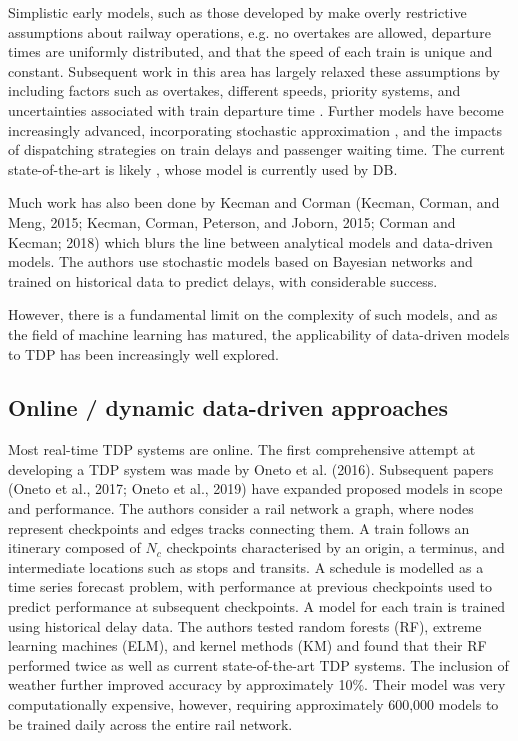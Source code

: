 \documentclass[12pt,a4paper]{article}
\begin{document}
Simplistic early models, such as those developed by \cite{frank_1966} make overly restrictive assumptions about railway operations, e.g. no overtakes are allowed, departure times are uniformly distributed, and that the speed of each train is unique and constant. Subsequent work in this area has largely relaxed these assumptions by including factors such as overtakes, different speeds, priority systems, and uncertainties associated with train departure time \cite{petersen_1974,chen_harker_1990}. Further models have become increasingly advanced, incorporating stochastic approximation \cite{carey_kwiecinski_1994}, and the impacts of dispatching strategies on train delays and passenger waiting time. The current state-of-the-art is likely \cite{berger_et_al_2011}, whose model is currently used by DB.

Much work has also been done by Kecman and Corman (Kecman, Corman, and Meng, 2015; Kecman, Corman, Peterson, and Joborn, 2015; Corman and Kecman; 2018) which blurs the line between analytical models and data-driven models. The authors use stochastic models based on Bayesian networks and trained on historical data to predict delays, with considerable success.

However, there is a fundamental limit on the complexity of such models, and as the field of machine learning has matured, the applicability of data-driven models to TDP has been increasingly well explored. 

\subsection{Online / dynamic data-driven approaches}

Most real-time TDP systems are online. The first comprehensive attempt at developing a TDP system was made by Oneto et al. (2016). Subsequent papers (Oneto et al., 2017; Oneto et al., 2019) have expanded proposed models in scope and performance.
The authors consider a rail network a graph, where nodes represent checkpoints and edges tracks connecting them. A train follows an itinerary composed of $N_c$ checkpoints characterised by an origin, a terminus, and intermediate locations such as stops and transits. A schedule is modelled as a time series forecast problem, with performance at previous checkpoints used to predict performance at subsequent checkpoints. A model for each train is trained using historical delay data. The authors tested random forests (RF), extreme learning machines (ELM), and kernel methods (KM) and found that their RF performed twice as well as current state-of-the-art TDP systems. The inclusion of weather further improved accuracy by approximately 10\%. Their model was very computationally expensive, however, requiring approximately 600,000 models to be trained daily across the entire rail network. 
\end{document}
